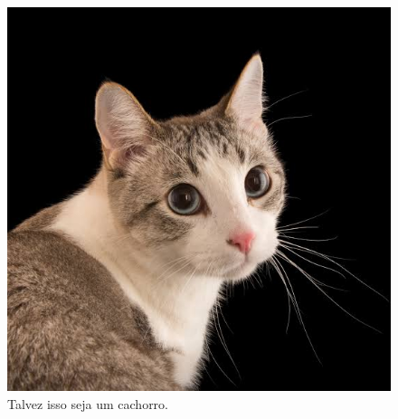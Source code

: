\documentclass[12pt,a4paper]{article}
\begin{document}
	\begin{figure}[h!]
		\centering
		\includegraphics[width=0.7\linewidth]{gato}
		\caption[Gato INSANO]{Talvez isso seja um cachorro.}
		\label{fig:gato}
	\end{figure}
\end{document}
